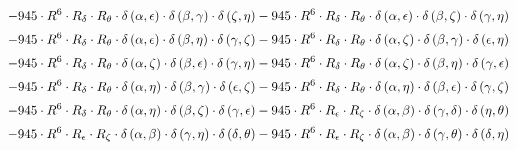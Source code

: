\begin{subequations}
\begin{gather}
 \\[0.2em] \notag 		 - 945 \cdot R^{6} \cdot R_{\delta{}} \cdot R_{\theta{}} \cdot \delta{}\left(\alpha{}, \epsilon{}\right) \cdot \delta{}\left(\beta{}, \gamma{}\right) \cdot \delta{}\left(\zeta{}, \eta{}\right)- 945 \cdot R^{6} \cdot R_{\delta{}} \cdot R_{\theta{}} \cdot \delta{}\left(\alpha{}, \epsilon{}\right) \cdot \delta{}\left(\beta{}, \zeta{}\right) \cdot \delta{}\left(\gamma{}, \eta{}\right) 
 \\[0.2em] \notag 		 - 945 \cdot R^{6} \cdot R_{\delta{}} \cdot R_{\theta{}} \cdot \delta{}\left(\alpha{}, \epsilon{}\right) \cdot \delta{}\left(\beta{}, \eta{}\right) \cdot \delta{}\left(\gamma{}, \zeta{}\right)- 945 \cdot R^{6} \cdot R_{\delta{}} \cdot R_{\theta{}} \cdot \delta{}\left(\alpha{}, \zeta{}\right) \cdot \delta{}\left(\beta{}, \gamma{}\right) \cdot \delta{}\left(\epsilon{}, \eta{}\right) 
 \\[0.2em] \notag 		 - 945 \cdot R^{6} \cdot R_{\delta{}} \cdot R_{\theta{}} \cdot \delta{}\left(\alpha{}, \zeta{}\right) \cdot \delta{}\left(\beta{}, \epsilon{}\right) \cdot \delta{}\left(\gamma{}, \eta{}\right)- 945 \cdot R^{6} \cdot R_{\delta{}} \cdot R_{\theta{}} \cdot \delta{}\left(\alpha{}, \zeta{}\right) \cdot \delta{}\left(\beta{}, \eta{}\right) \cdot \delta{}\left(\gamma{}, \epsilon{}\right) 
 \\[0.2em] \notag 		 - 945 \cdot R^{6} \cdot R_{\delta{}} \cdot R_{\theta{}} \cdot \delta{}\left(\alpha{}, \eta{}\right) \cdot \delta{}\left(\beta{}, \gamma{}\right) \cdot \delta{}\left(\epsilon{}, \zeta{}\right)- 945 \cdot R^{6} \cdot R_{\delta{}} \cdot R_{\theta{}} \cdot \delta{}\left(\alpha{}, \eta{}\right) \cdot \delta{}\left(\beta{}, \epsilon{}\right) \cdot \delta{}\left(\gamma{}, \zeta{}\right) 
 \\[0.2em] \notag 		 - 945 \cdot R^{6} \cdot R_{\delta{}} \cdot R_{\theta{}} \cdot \delta{}\left(\alpha{}, \eta{}\right) \cdot \delta{}\left(\beta{}, \zeta{}\right) \cdot \delta{}\left(\gamma{}, \epsilon{}\right)- 945 \cdot R^{6} \cdot R_{\epsilon{}} \cdot R_{\zeta{}} \cdot \delta{}\left(\alpha{}, \beta{}\right) \cdot \delta{}\left(\gamma{}, \delta{}\right) \cdot \delta{}\left(\eta{}, \theta{}\right) 
 \\[0.2em] \notag 		 - 945 \cdot R^{6} \cdot R_{\epsilon{}} \cdot R_{\zeta{}} \cdot \delta{}\left(\alpha{}, \beta{}\right) \cdot \delta{}\left(\gamma{}, \eta{}\right) \cdot \delta{}\left(\delta{}, \theta{}\right)- 945 \cdot R^{6} \cdot R_{\epsilon{}} \cdot R_{\zeta{}} \cdot \delta{}\left(\alpha{}, \beta{}\right) \cdot \delta{}\left(\gamma{}, \theta{}\right) \cdot \delta{}\left(\delta{}, \eta{}\right) 

\end{gather}
\end{subequations}
